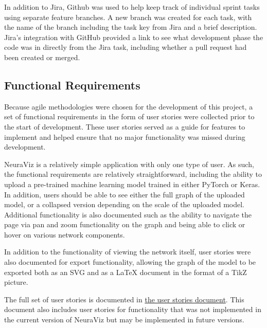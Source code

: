 In addition to Jira, Github was used to help keep track of individual sprint tasks using separate feature branches. A new branch was created for each task, with the name of the branch including the task key from Jira and a brief description. Jira's integration with GitHub provided a link to see what development phase the code was in directly from the Jira task, including whether a pull request had been created or merged.

\subsection{Functional Requirements}
Because agile methodologies were chosen for the development of this project, a set of functional requirements in the form of user stories were collected prior to the start of development. These user stories served as a guide for features to implement and helped ensure that no major functionality was missed during development.

NeuraViz is a relatively simple application with only one type of user. As such, the functional requirements are relatively straightforward, including the ability to upload a pre-trained machine learning model trained in either PyTorch or Keras. In addition, users should be able to see either the full graph of the uploaded model, or a collapsed version depending on the scale of the uploaded model. Additional functionality is also documented such as the ability to navigate the page via pan and zoom functionality on the graph and being able to click or hover on various network components. 

In addition to the functionality of viewing the network itself, user stories were also documented for export functionality, allowing the graph of the model to be exported both as an SVG and as a \LaTeX{} document in the format of a TikZ picture. 

The full set of user stories is documented in \href{https://github.com/Bennett-Wendorf/NeuraViz/blob/main/docs/user_stories.md}{the user stories document}. This document also includes user stories for functionality that was not implemented in the current version of NeuraViz but may be implemented in future versions.


